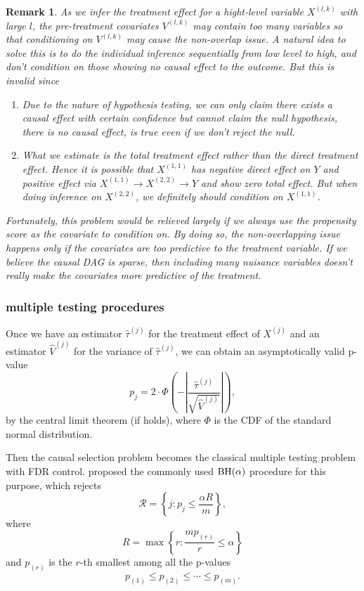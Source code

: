 \documentclass[11pt]{article}
\newtheorem{remark}{Remark}[section]
\newcommand{\cR}{\mathcal{R}}
\newcommand{\BH}{{\textnormal{BH}}}
\newcommand{\pth}[1]{\left( #1 \right)}
\newcommand{\abs}[1]{\left| #1 \right|}
\newcommand{\set}[1]{\left \{  #1 \right \}}
\begin{document}
\begin{remark}
    As we infer the treatment effect for a hight-level variable $X^{(l,k)}$ with large $l$, the pre-treatment covariates $V^{(l,k)}$ may contain too many variables so that conditioning on $V^{(l,k)}$ may cause the non-overlap issue. A natural idea to solve this is to do the individual inference sequentially from low level to high, and don't condition on those showing no causal effect to the outcome. But this is invalid since
    \begin{enumerate}
        \item Due to the nature of hypothesis testing, we can only claim there exists a causal effect with certain confidence but cannot claim the null hypothesis, there is no causal effect, is true even if we don't reject the null.
        \item What we estimate is the total treatment effect rather than the direct treatment effect. Hence it is possible that $X^{(1,1)}$ has negative direct effect on $Y$ and positive effect via $X^{(1,1)} \to X^{(2,2)} \to Y$ and show zero total effect. But when doing inference on $X^{(2,2)}$, we definitely should condition on $X^{(1,1)}$.
    \end{enumerate}
    Fortunately, this problem would be relieved largely if we always use the propensity score as the covariate to condition on. By doing so, the non-overlapping issue happens only if the covariates are too predictive to the treatment variable. If we believe the causal DAG is sparse, then including many nuisance variables doesn't really make the covariates more predictive of the treatment.
\end{remark}

\subsubsection{multiple testing procedures}%
\label{subsub:multiple_testing_procedures}

Once we have an estimator $\hat \tau^{(j)}$ for the treatment effect of $X^{(j)}$ and an estimator $\hat V^{(j)}$ for the variance of $\hat \tau^{(j)}$, we can obtain an asymptotically valid p-value
\[ p_j = 2 \cdot \Phi \pth{-\abs{\frac{\hat \tau^{(j)}}{\sqrt{\hat V^{(j)}}}}}, \]
by the central limit theorem (if holds), where $\Phi$ is the CDF of the standard normal distribution.

Then the causal selection problem becomes the classical multiple testing problem with FDR control. \citet{benjamini1995controlling} proposed the commonly used $\BH(\alpha)$ procedure for this purpose, which rejects
\[ \cR = \set{j: p_j \leq \frac{\alpha R}{m}}, \]
where
\[ R = \max \set{r: \frac{m p_{(r)}}{r} \leq \alpha} \]
and $p_{(r)}$ is the $r$-th smallest among all the p-values
\[ p_{(1)} \leq p_{(2)} \leq \cdots \leq p_{(m)}. \]
\end{document}
